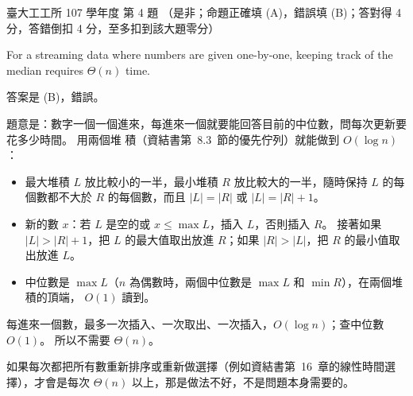 \begin{pastexam}[label={px:ntu-107-ie-ds-04}]{臺大工工所 107 學年度 第 4 題}
（是非；命題正確填 (A)，錯誤填 (B)；答對得 4 分，答錯倒扣 4 分，至多扣到該大題零分）

For a streaming data where numbers are given one-by-one, keeping track of the median requires $\Theta(n)$ time.
\end{pastexam}

\begin{pastsoln}
答案是 (B)，錯誤。

題意是：數字一個一個進來，每進來一個就要能回答目前的中位數，問每次更新要花多少時間。 用兩個堆
積（資結書第~8.3~節的優先佇列）就能做到 $O(\log n)$：
\begin{itemize}
\item 最大堆積 $L$ 放比較小的一半，最小堆積 $R$ 放比較大的一半，隨時保持 $L$ 的每個數都不大於
$R$ 的每個數，而且 $|L| = |R|$ 或 $|L| = |R| + 1$。
\item 新的數 $x$：若 $L$ 是空的或 $x \le \max L$，插入 $L$，否則插入 $R$。 接著如果
$|L| > |R| + 1$，把 $L$ 的最大值取出放進 $R$；如果 $|R| > |L|$，把 $R$ 的最小值取出放進 $L$。
\item 中位數是 $\max L$（$n$ 為偶數時，兩個中位數是 $\max L$ 和 $\min R$），在兩個堆積的頂端，
$O(1)$ 讀到。
\end{itemize}
每進來一個數，最多一次插入、一次取出、一次插入，$O(\log n)$；查中位數 $O(1)$。 所以不需要
$\Theta(n)$。

如果每次都把所有數重新排序或重新做選擇（例如資結書第~16~章的線性時間選擇），才會是每次
$\Theta(n)$ 以上，那是做法不好，不是問題本身需要的。
\end{pastsoln}
